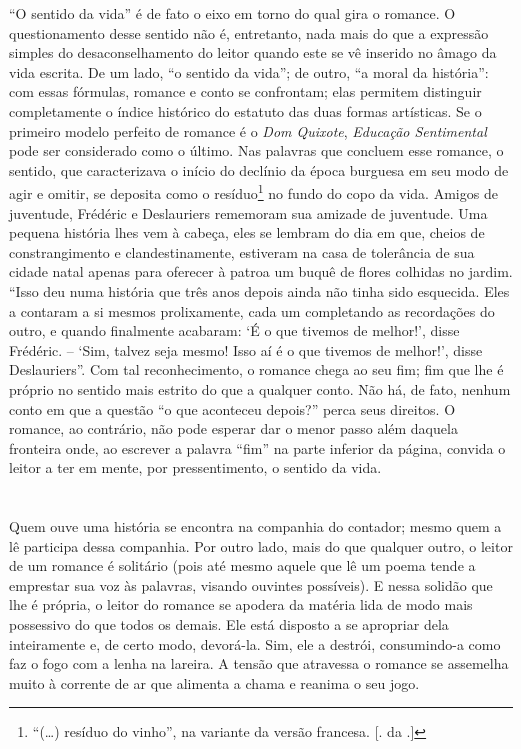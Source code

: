 ``O sentido da vida'' é de fato o eixo em torno do qual gira o romance.
O questionamento desse sentido não é, entretanto, nada mais do que a
expressão simples do desaconselhamento do leitor quando este se vê
inserido no âmago da vida escrita. De um lado, ``o sentido da vida'';
de outro, ``a moral da história'': com essas fórmulas, romance e conto
se confrontam; elas permitem distinguir completamente o índice histórico
do estatuto das duas formas artísticas. Se o primeiro modelo perfeito de
romance é o \emph{Dom Quixote}, \emph{Educação Sentimental} pode ser
considerado como o último. Nas palavras que concluem esse romance, o
sentido, que caracterizava o início do declínio da época burguesa em seu
modo de agir e omitir, se deposita como o resíduo\footnote{``(\ldots{}) resíduo do
  vinho'', na variante da versão francesa. [. da .]} no fundo do
copo da vida. Amigos de juventude, Frédéric e Deslauriers rememoram sua
amizade de juventude. Uma pequena história lhes vem à cabeça, eles se
lembram do dia em que, cheios de constrangimento e clandestinamente,
estiveram na casa de tolerância de sua cidade natal apenas para oferecer
à patroa um buquê de flores colhidas no jardim. ``Isso deu numa história
que três anos depois ainda não tinha sido esquecida. Eles a contaram a
si mesmos prolixamente, cada um completando as recordações do outro, e
quando finalmente acabaram: `É o que tivemos de melhor!', disse
Frédéric. -- `Sim, talvez seja mesmo! Isso aí é o que tivemos de
melhor!', disse Deslauriers''. Com tal reconhecimento, o romance chega
ao seu fim; fim que lhe é próprio no sentido mais estrito do que a
qualquer conto. Não há, de fato, nenhum conto em que a questão ``o que
aconteceu depois?'' perca seus direitos. O romance, ao contrário, não
pode esperar dar o menor passo além daquela fronteira onde, ao escrever
a palavra ``fim'' na parte inferior da página, convida o leitor a ter em
mente, por pressentimento, o sentido da vida.

\section{}

Quem ouve uma história se encontra na companhia do contador; mesmo quem
a lê participa dessa companhia. Por outro lado, mais do que qualquer
outro, o leitor de um romance é solitário (pois até mesmo aquele que lê
um poema tende a emprestar sua voz às palavras, visando ouvintes
possíveis). E nessa solidão que lhe é própria, o leitor do romance se
apodera da matéria lida de modo mais possessivo do que todos os demais.
Ele está disposto a se apropriar dela inteiramente e, de certo modo,
devorá-la. Sim, ele a destrói, consumindo-a como faz o fogo com a lenha
na lareira. A tensão que atravessa o romance se assemelha muito à
corrente de ar que alimenta a chama e reanima o seu jogo.

